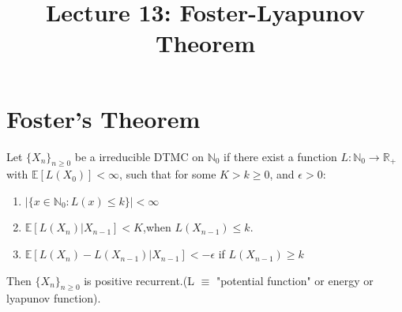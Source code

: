 \documentclass[a4paper,10pt,english]{article}
\title{Lecture 13: Foster-Lyapunov Theorem}
\date{}%
\author{}
\begin{document}
\maketitle
\section{Foster's Theorem}
\begin{thm}[Foster,1950]
Let $\{X_n\}_{n \geq 0}$ be a irreducible DTMC on $\mathbb{N}_0$ if there exist a function $L : \mathbb{N}_0 \longrightarrow \mathbb{R}_+$ with $\mathbb{E}[L(X_0)] < \infty$, such that for some $K>k\geq0$, and $\epsilon>0$:
\begin{enumerate}
\item $|\{x \in \mathbb{N}_0 : L(x) \leq k\}| < \infty$
\item $\mathbb{E}[L(X_n)|X_{n-1}] < K$,when $L(X_{n-1}) \leq k$.
\item $\mathbb{E}[L(X_n)-L(X_{n-1})|X_{n-1}] < -\epsilon$ if $L(X_{n-1})\geq k$
\end{enumerate}
Then $\{X_n\}_{n \geq 0}$ is positive recurrent.(L $\equiv$ "potential function" or energy or lyapunov function).
\end{thm}
\end{document}
